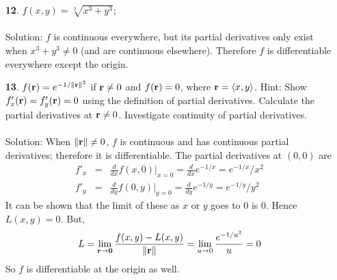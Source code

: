 \documentclass[12pt]{amsbook}
\newcommand{\la}{\langle}
\newcommand{\ra}{\rangle}
\begin{document}
\begin{enumerate}
\\
\\
{\sc Solution}: $f$ is continuous when $1-\|{\bf r}\|>0 \ \Rightarrow \ \|{\bf r}\|<1$. $f$ has continuous partial derivatives when $1-\|{\bf r}\| \neq 0$, which is included in the above condition. Hence $f$ is differentiable in the ball $\|{\bf r}\|<1$. 
\\
\item[{\small\bf 12}.] $f(x,y)=\sqrt[3]{x^3+y^3}$;
\\
\\
{\sc Solution}: $f$ is continuous everywhere, but its partial derivatives only exist when $x^3+y^3 \neq 0$ (and are continuous elsewhere). Therefore $f$ is differentiable everywhere except the origin.
\\
\item[{\small\bf 13}.] $f({\bf r})=e^{-1/\|{\bf r}\|^2}$ if ${\bf r}\neq 0$ and $f({\bf r}) = 0$, where ${\bf r}=\la x,y \ra$.
Hint: Show $f'_x({\bf r})=f'_y({\bf r})=0$ using the definition of partial derivatives.
Calculate the partial derivatives at ${\bf r}\neq 0$. Investigate continuity
of partial derivatives.
\\
\\
{\sc Solution}: When $\|{\bf r}\|\neq 0$, $f$ is continuous and has continuous partial derivatives; therefore it is differentiable. The partial derivatives at $(0,0)$ are 
\begin{eqnarray*}
f'_x&=&\frac{d}{dx}f(x,0)|_{x=0}=\frac{d}{dx}e^{-1/x}=e^{-1/x}/x^2 \\
f'_y&=&\frac{d}{dy}f(0,y)|_{y=0}=\frac{d}{dy}e^{-1/y}=e^{-1/y}/y^2 
\end{eqnarray*}
It can be shown that the limit of these as $x$ or $y$ goes to $0$ is $0$. Hence $L(x,y)=0$. But,
$$L=\lim_{{\bf r} \rightarrow {\bf 0}}\frac{f(x,y)-L(x,y)}{\|{\bf r}\|}=\lim_{u \rightarrow 0}\frac{e^{-1/u^2}}{u}=0$$
So $f$ is differentiable at the origin as well.
\\
\end{enumerate}
\end{document}
